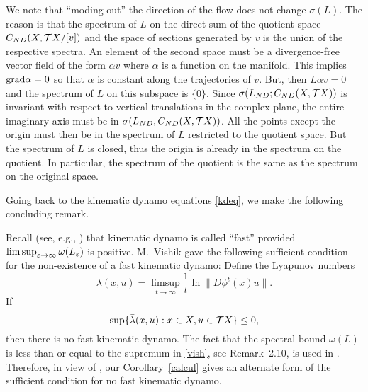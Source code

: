 We note that
``moding out'' the direction of the
flow does not change $\sigma(L)$.
The reason is that the spectrum
of $L$ on the direct sum of the quotient space $C_{ND}(X, {{\cal{T}}X}
/[v])$ and the space of sections generated by $v$ is the union of the
respective spectra.
An element of the second space must be a divergence-free
vector field of the form $\alpha v$ where $\alpha$ is a function on
the manifold. This implies $\hbox{\rm grad} \alpha=0$ so that $\alpha$
is constant along the trajectories of $v$. But, then $L\alpha v=0$
and the spectrum of $L$ on this subspace is $\{0\}$.
Since $\sigma(L_{ND};{C_{ND}(X,{{\cal{T}}X})})$ is
invariant with respect to
vertical translations in the complex plane,
the entire imaginary axis must be in $\sigma(L_{ND},{C_{ND}(X,{{\cal{T}}X})})$.
All the
points except the origin must then be in the spectrum of
$L$ restricted
to the quotient space.
But the spectrum of $L$ is closed,
thus the origin is already in the spectrum
on the quotient. In particular, the spectrum of the  quotient is
the same as the spectrum on the original space.

Going back to the  kinematic dynamo equations \eqref{kdeq}, we
make the following concluding remark.

 Recall (see,
e.g., \cite{Arnold,AZRS,BC}) that kinematic dynamo is called
``fast'' provided $\limsup_{\varepsilon\to\infty}\omega(L_\varepsilon)$ is positive.
M.~Vishik \cite{Vishik} gave the following sufficient condition for
the non-existence of a fast kinematic dynamo:
Define the Lyapunov numbers
\[
\bar{\lambda}(x,u)=\limsup_{t\to\infty}
\dfrac{1}{t}\ln\|D\phi^t(x)u\|.
\]
If
\begin{equation}\label{vish}
\sup \{
\bar{\lambda}(x,u):
x\in X, u\in {{\cal{T}}X}
\}\leq 0,
\end{equation}
then there is no fast kinematic dynamo.
The fact that
the spectral bound $\omega(L)$ is less than or
equal to the supremum in
\eqref{vish}, see Remark~2.10, is used in \cite{Vishik}.
Therefore, in view of \cite{Vishik},
our Corollary~\ref{calcul} gives an alternate form of the
sufficient condition for no fast kinematic dynamo.
